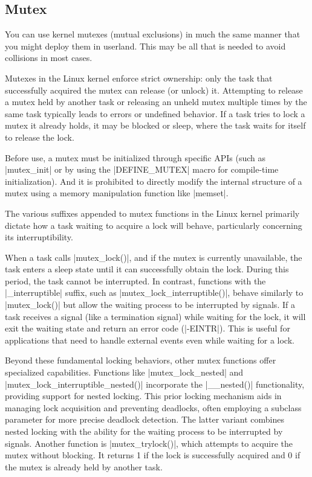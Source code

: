\documentclass[10pt, oneside]{book}
\begin{document}
\subsection{Mutex}
\label{sec:mutex}
You can use kernel mutexes (mutual exclusions) in much the same manner that you might deploy them in userland.
This may be all that is needed to avoid collisions in most cases.

Mutexes in the Linux kernel enforce strict ownership: only the task that successfully acquired the mutex can release (or unlock) it.
Attempting to release a mutex held by another task or releasing an unheld mutex multiple times by the same task typically leads to errors or undefined behavior.
If a task tries to lock a mutex it already holds, it may be blocked or sleep, where the task waits for itself to release the lock.

Before use, a mutex must be initialized through specific APIs (such as \cpp|mutex_init| or by using the \cpp|DEFINE_MUTEX| macro for compile-time initialization).
And it is prohibited to directly modify the internal structure of a mutex using a memory manipulation function like \cpp|memset|.


The various suffixes appended to mutex functions in the Linux kernel primarily dictate how a task waiting to acquire a lock will behave,
particularly concerning its interruptibility.

When a task calls \cpp|mutex_lock()|, and if the mutex is currently unavailable,
the task enters a sleep state until it can successfully obtain the lock.
During this period, the task cannot be interrupted.
In contrast, functions with the \cpp|_interruptible| suffix, such as \cpp|mutex_lock_interruptible()|,
behave similarly to \cpp|mutex_lock()| but allow the waiting process to be interrupted by signals.
If a task receives a signal (like a termination signal) while waiting for the lock,
it will exit the waiting state and return an error code (\cpp|-EINTR|).
This is useful for applications that need to handle external events even while waiting for a lock.

Beyond these fundamental locking behaviors, other mutex functions offer specialized capabilities.
Functions like \cpp|mutex_lock_nested| and \cpp|mutex_lock_interruptible_nested()| incorporate the \cpp|__nested()| functionality,
providing support for nested locking.
This prior locking mechanism aids in managing lock acquisition and preventing deadlocks,
often employing a subclass parameter for more precise deadlock detection.
The latter variant combines nested locking with the ability for the waiting process to be interrupted by signals.
Another function is \cpp|mutex_trylock()|, which attempts to acquire the mutex without blocking.
It returns 1 if the lock is successfully acquired and 0 if the mutex is already held by another task.
\end{document}
